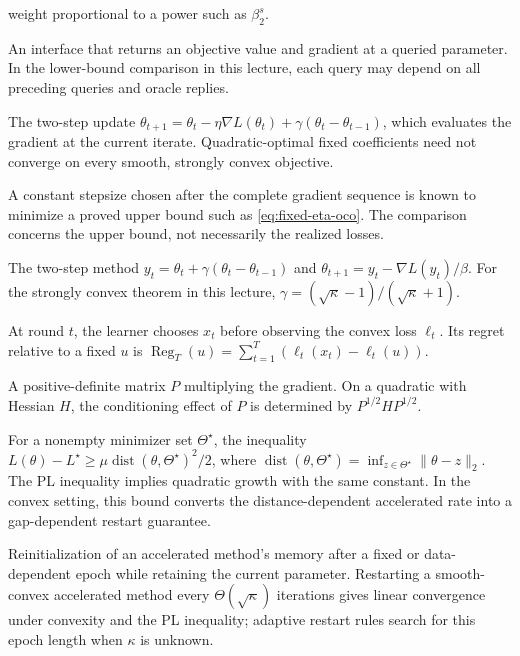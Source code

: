 \documentclass[11pt,twoside]{article}
\theoremstyle{definition}
\theoremstyle{remark}
\begin{document}
\begin{description}[style=nextline,leftmargin=1.5em,labelindent=0pt]
weight proportional to a power such as $\beta_2^s$.
\item[First-order oracle]
An interface that returns an objective value and gradient at a queried
parameter. In the lower-bound comparison in this lecture, each query may
depend on all preceding queries and oracle replies.
\item[Heavy-ball method]
The two-step update
$\theta_{t+1}=\theta_t-\eta\nabla L(\theta_t)
+\gamma(\theta_t-\theta_{t-1})$, which evaluates the gradient at the current
iterate. Quadratic-optimal fixed coefficients need not converge on every
smooth, strongly convex objective.
\item[Hindsight-tuned stepsize]
A constant stepsize chosen after the complete gradient sequence is known to
minimize a proved upper bound such as \cref{eq:fixed-eta-oco}. The comparison
concerns the upper bound, not necessarily the realized losses.
\item[Nesterov accelerated gradient]
The two-step method
$y_t=\theta_t+\gamma(\theta_t-\theta_{t-1})$ and
$\theta_{t+1}=y_t-\nabla L(y_t)/\beta$. For the strongly convex theorem in
this lecture, $\gamma=(\sqrt\kappa-1)/(\sqrt\kappa+1)$.
\item[Online convex optimization and regret]
At round $t$, the learner chooses $x_t$ before observing the convex loss
$\ell_t$. Its regret relative to a fixed $u$ is
$\operatorname{Reg}_T(u)=\sum_{t=1}^T(\ell_t(x_t)-\ell_t(u))$.
\item[Preconditioner]
A positive-definite matrix $P$ multiplying the gradient. On a quadratic with
Hessian $H$, the conditioning effect of $P$ is determined by
$P^{1/2}HP^{1/2}$.
\item[Quadratic growth]
For a nonempty minimizer set $\Theta^\star$, the inequality
$L(\theta)-L^\star\ge
\mu\operatorname{dist}(\theta,\Theta^\star)^2/2$, where
$\operatorname{dist}(\theta,\Theta^\star)
=\inf_{z\in\Theta^\star}\|\theta-z\|_2$. The PL inequality implies quadratic
growth with the same constant. In the convex setting, this bound converts the
distance-dependent accelerated rate into a gap-dependent restart guarantee.
\item[Restart]
Reinitialization of an accelerated method's memory after a fixed or
data-dependent epoch while retaining the current parameter. Restarting a
smooth-convex accelerated method every $\Theta(\sqrt\kappa)$ iterations gives
linear convergence under convexity and the PL inequality; adaptive restart
rules search for this epoch length when $\kappa$ is unknown.
\item[Scalar online adaptation]

\end{description}
\end{document}
